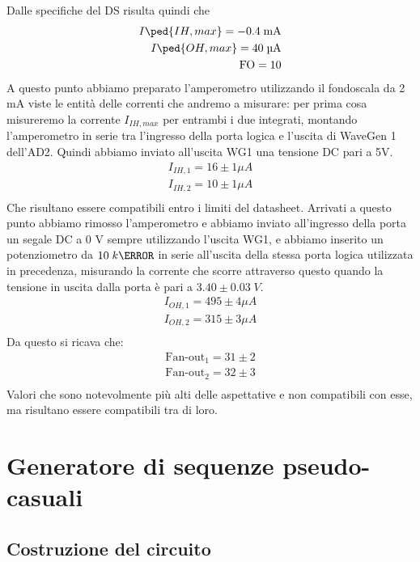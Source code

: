 \documentclass[10pt, a4paper, italian]{article}
\begin{document}
Dalle specifiche del DS risulta quindi che 
\begin{align*}
    I\ped{IH, max}= -0.4 \; \si{m\A} \\
    I\ped{OH, max}= 40 \; \si{\micro\A} \\
    \text{FO} = 10
\end{align*}
A questo punto abbiamo preparato l'amperometro utilizzando il fondoscala da 2 mA viste le entità delle correnti che andremo a misurare: per prima cosa misureremo la corrente $I_{IH,max}$ per entrambi i due integrati, montando l'amperometro in serie tra l'ingresso della porta logica e l'uscita di WaveGen 1 dell'AD2. Quindi abbiamo inviato all'uscita WG1 una tensione DC pari a 5V.
\begin{gather*}
    I_{IH,1}=16 \pm 1 \mu A\\
    I_{IH,2}=10 \pm 1 \mu A\\   
\end{gather*}
Che risultano essere compatibili entro i limiti del datasheet.
Arrivati a questo punto abbiamo rimosso l'amperometro e abbiamo inviato all'ingresso della porta un segale DC a 0 V sempre utilizzando l'uscita WG1, e abbiamo inserito un potenziometro da $10 \; k\ohm$ in serie all'uscita della stessa porta logica utilizzata in precedenza, misurando la corrente che scorre attraverso questo quando la tensione in uscita dalla porta è pari a $3.40 \pm 0.03 \; V$.
\begin{gather*}
    I_{OH,1}=495 \pm 4 \mu A\\
    I_{OH,2}=315 \pm 3 \mu A\\   
\end{gather*}
Da questo si ricava che:
\begin{gather*}
    \mbox{Fan-out}_1=31 \pm 2\\
    \mbox{Fan-out}_2=32 \pm 3\\
\end{gather*}
Valori che sono notevolmente più alti delle aspettative e non compatibili con esse, ma risultano essere compatibili tra di loro.

\section{Generatore di sequenze pseudo-casuali}
\subsection{Costruzione del circuito}
\end{document}
